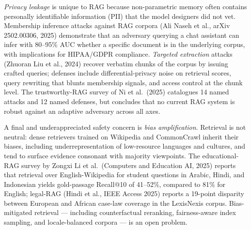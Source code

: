 \emph{Privacy leakage} is unique to RAG because non-parametric memory often contains personally identifiable information (PII) that the model designers did not vet. Membership inference attacks against RAG corpora (Ali Naseh et al., arXiv 2502.00306, 2025) demonstrate that an adversary querying a chat assistant can infer with 80--95\% AUC whether a specific document is in the underlying corpus, with implications for HIPAA/GDPR compliance. \emph{Targeted extraction} attacks (Zhuoran Liu et al., 2024) recover verbatim chunks of the corpus by issuing crafted queries; defenses include differential-privacy noise on retrieval scores, query rewriting that blunts membership signals, and access control at the chunk level. The trustworthy-RAG survey of Ni et al.~(2025) catalogues 14 named attacks and 12 named defenses, but concludes that no current RAG system is robust against an adaptive adversary across all axes.

A final and underappreciated safety concern is \emph{bias amplification}. Retrieval is not neutral: dense retrievers trained on Wikipedia and CommonCrawl inherit their biases, including underrepresentation of low-resource languages and cultures, and tend to surface evidence consonant with majority viewpoints. The educational-RAG survey by Zongxi Li et al.~(Computers and Education AI, 2025) reports that retrieval over English-Wikipedia for student questions in Arabic, Hindi, and Indonesian yields gold-passage Recall@10 of 41--52\%, compared to 81\% for English; legal-RAG (Hindi et al., IEEE Access 2025) reports a 19-point disparity between European and African case-law coverage in the LexisNexis corpus. Bias-mitigated retrieval --- including counterfactual reranking, fairness-aware index sampling, and locale-balanced corpora --- is an open problem.

